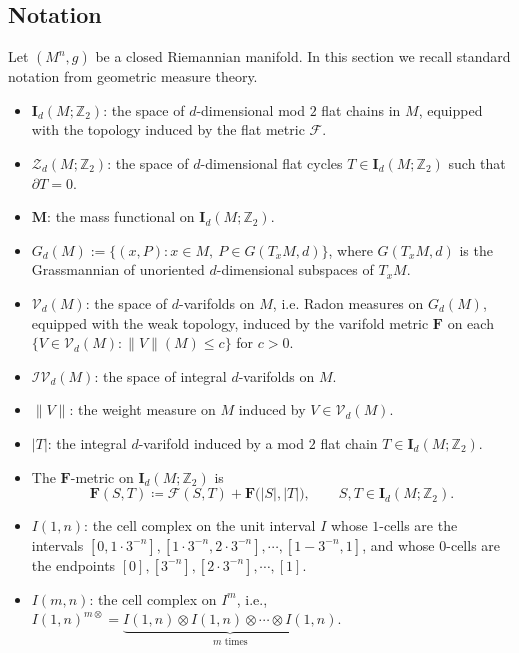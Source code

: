 \documentclass[12pt,english]{article}
\theoremstyle{definition}
\begin{document}
\subsection{Notation}
Let $(M^{n},g)$ be a closed Riemannian manifold. In this section we recall standard notation from geometric measure theory.
\begin{itemize}
    \item $\mathbf{I}_d(M;\mathbb{Z}_2)$: the space of $d$-dimensional mod $2$ flat chains in $M$, equipped with the topology induced by the flat metric $\mathcal{F}$.
    \item $\mathcal{Z}_d(M;\mathbb{Z}_2)$: the space of $d$-dimensional flat cycles $T \in \mathbf{I}_d(M;\mathbb{Z}_2)$ such that $\partial T = 0$.
    \item $\mathbf{M}$: the mass functional on $\mathbf{I}_d(M;\mathbb{Z}_2)$.
    \item $G_d(M):=\{(x,P): x\in M,\ P\in G(T_xM,d)\}$, where $G(T_xM,d)$ is the Grassmannian of unoriented $d$-dimensional subspaces of $T_xM$.
    \item $\mathcal{V}_d(M)$: the space of $d$-varifolds on $M$, i.e. Radon measures on $G_d(M)$, equipped with the weak topology, induced by the varifold metric $\mathbf{F}$ on each $\{V\in\mathcal{V}_d(M):\lVert V \rVert (M) \leq c\}$ for $c>0$.
    \item $\mathcal{IV}_d(M)$: the space of integral $d$-varifolds on $M$.
    \item $\|V\|$: the weight measure on $M$ induced by $V\in\mathcal{V}_d(M)$.
    \item $|T|$: the integral $d$-varifold induced by a mod $2$ flat chain $T\in\mathbf{I}_d(M;\mathbb{Z}_2)$.
    \item The $\mathbf{F}$-metric on $\mathbf{I}_d(M;\mathbb{Z}_2)$ is
    \[
        \mathbf{F}(S,T)\coloneqq \mathcal{F}(S,T)+\mathbf{F}\bigl(|S|,|T|\bigr),\qquad S,T\in\mathbf{I}_d(M;\mathbb{Z}_2).
    \]
    \item $I(1, n)$: the cell complex on the unit interval $I$ whose $1$-cells are the intervals $[0, 1 \cdot 3^{-n}], [1 \cdot 3^{-n}, 2 \cdot 3^{-n}], \cdots, [1 - 3^{-n}, 1]$, and whose $0$-cells are the endpoints $[0], [3^{-n}], [2\cdot 3^{-n}], \cdots, [1]$.
    \item $I(m, n)$: the cell complex on $I^m$, i.e., $I(1, n)^{m\otimes} = \underbrace{I(1, n)\otimes I(1, n)\otimes \cdots \otimes I(1, n)}_{\text{$m$ times}}$.
\end{itemize}
\end{document}
